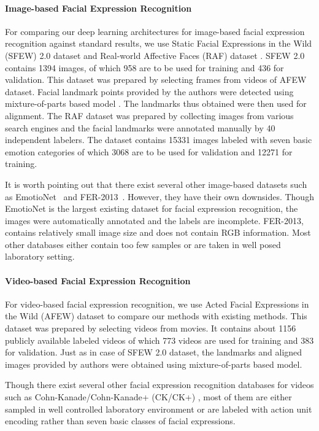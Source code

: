\documentclass[10pt,twocolumn,letterpaper]{article}
\begin{document}
	\paragraph{Image-based Facial Expression Recognition}
	
	For comparing our deep learning architectures for image-based facial expression recognition against standard results, we use Static Facial Expressions in the Wild (SFEW) 2.0 \cite{sfew} \cite{afew} dataset and Real-world Affective Faces (RAF) dataset \cite{dlpcnn}. SFEW 2.0 contains 1394 images, of which 958 are to be used for training and 436 for validation. This dataset was prepared by selecting frames from videos of AFEW dataset. Facial landmark points provided by the authors were detected using mixture-of-parts based model \cite{zhuandramanan}. The landmarks thus obtained were then used for alignment. The RAF dataset \cite{dlpcnn} was prepared by collecting images from various search engines and the facial landmarks were annotated manually by 40 independent labelers. The dataset contains 15331 images labeled with seven basic emotion categories of which 3068 are to be used for validation and 12271 for training.
	
	It is worth pointing out that there exist several other image-based datasets such as EmotioNet~\cite{emotionet} and FER-2013~\cite{goodfellow}. However, they have their own downsides. Though EmotioNet is the largest existing dataset for facial expression recognition, the images were automatically annotated and the labels are incomplete. FER-2013, contains relatively small image size and does not contain RGB information. Most other databases either contain too few samples or are taken in well posed laboratory setting.
	
	\paragraph{Video-based Facial Expression Recognition}
	For video-based facial expression recognition, we use Acted Facial Expressions in the Wild (AFEW) dataset to compare our methods with existing methods. This dataset was prepared by selecting videos from movies. It contains about 1156 publicly available labeled videos of which 773 videos are used for training and 383 for validation. Just as in case of SFEW 2.0 dataset, the landmarks and aligned images provided by authors were obtained using mixture-of-parts based model.
	
	Though there exist several other facial expression recognition databases for videos such as Cohn-Kanade/Cohn-Kanade+ (CK/CK+) \cite{ck}\cite{ckp},  most of them are either sampled in well controlled laboratory environment or are labeled with action unit encoding rather than seven basic classes of facial expressions.
	
\end{document}
